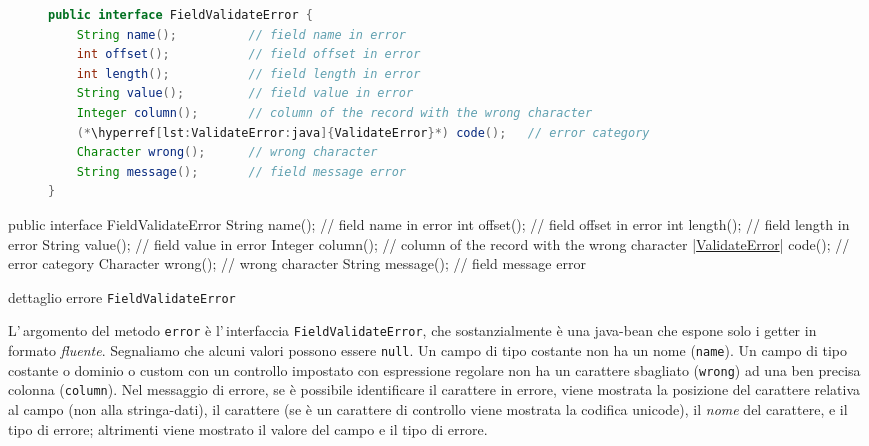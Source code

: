 \ifesource
\begin{figure*}[!htb]
\begin{lstlisting}[language=java, 
caption={dettaglio errore \texttt{FieldValidateError}}, 
label=lst:FieldValidateError:java]
public interface FieldValidateError {
    String name();          // field name in error
    int offset();           // field offset in error
    int length();           // field length in error
    String value();         // field value in error
    Integer column();       // column of the record with the wrong character
    (*\hyperref[lst:ValidateError:java]{ValidateError}*) code();   // error category
    Character wrong();      // wrong character
    String message();       // field message error
}
\end{lstlisting}
\end{figure*}
\else
\begin{elisting}[!htb]
\begin{javacode}
public interface FieldValidateError {
    String name();          // field name in error
    int offset();           // field offset in error
    int length();           // field length in error
    String value();         // field value in error
    Integer column();       // column of the record with the wrong character
    |\hyperref[lst:ValidateError:java]{ValidateError}| code();   // error category
    Character wrong();      // wrong character
    String message();       // field message error
}
\end{javacode}
\caption{dettaglio errore \texttt{FieldValidateError}}
\label{lst:FieldValidateError:java}
\end{elisting}
\fi

L'\,argomento del metodo \texttt{error} è l'\,interfaccia
\texttt{FieldValidateError}, che sostanzialmente è una java-bean che espone solo
i getter in formato \textit{fluente}.
Segnaliamo che alcuni valori possono essere \texttt{null}.
Un campo di tipo costante non ha un nome (\texttt{name}). 
Un campo di tipo costante o dominio o custom con un controllo impostato con 
espressione regolare non ha un carattere sbagliato (\texttt{wrong})
ad una ben precisa colonna (\texttt{column}).
Nel messaggio di errore, se è possibile identificare il carattere in
errore, viene mostrata la posizione del carattere relativa al campo (non alla 
stringa-dati), il carattere (se è un carattere di controllo viene mostrata la
codifica unicode), il \textit{nome} del carattere, e il tipo di errore; 
altrimenti viene mostrato il valore del campo e il tipo di errore.

